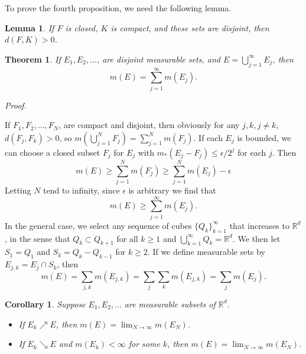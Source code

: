 \documentclass[
]{book}
\providecommand{\tightlist}{%
  \setlength{\itemsep}{0pt}\setlength{\parskip}{0pt}}
\newtheorem{theorem}{Theorem}[chapter]
\newtheorem{lemma}{Lemma}[chapter]
\newtheorem{corollary}{Corollary}[chapter]
\theoremstyle{definition}
\theoremstyle{definition}
\theoremstyle{definition}
\theoremstyle{definition}
\theoremstyle{remark}
\begin{document}
To prove the fourth proposition, we need the following lemma.

\begin{lemma}
If \(F\) is closed, \(K\) is compact, and these sets are disjoint, then \(d(F,K)>0\).
\end{lemma}

\begin{theorem}
If \(E_1,E_2,\dots\), are disjoint measurable sets, and \(E=\bigcup_{j=1}^{\infty}E_j\), then
\[
m(E)=\sum_{j=1}^{\infty}m(E_j).
\]
\end{theorem}

\emph{Proof.}

If \(F_1,F_2,\dots, F_N\), are compact and disjoint, then obviously for any \(j,k,j\ne k\), \(d(F_j,F_k)>0\), so \(m\left(\bigcup_{j=1}^NF_j\right)=\sum_{j=1}^Nm(F_j)\). If each \(E_j\) is bounded, we can choose a closed subset \(F_j\) for \(E_j\) with \(m_{\ast}(E_j-F_j)\leq \epsilon/2^j\) for each \(j\). Then
\[
  m(E) \geq \sum_{j=1}^Nm(F_j) \ge \sum_{j=1}^Nm(E_j)-\epsilon
\]
Letting \(N\) tend to infinity, since \(\epsilon\) is arbitrary we find that
\[
  m(E)\ge\sum_{j=1}^{\infty}m(E_j).
\]
In the general case, we select any sequence of cubes \(\{Q_k\}_{k=1}^{\infty}\) that increases to \(\mathbb{R}^d\), in the sense that \(Q_k\subset Q_{k+1}\) for all \(k\ge 1\) and \(\bigcup_{k=1}^{\infty}Q_k=\mathbb{R}^d\). We then let \(S_1=Q_1\) and \(S_k=Q_k-Q_{k-1}\) for \(k\ge 2\). If we define measurable sets by \(E_{j,k}=E_j\cap S_k\), then
\[
  m(E) =\sum_{j,k}m(E_{j,k})=\sum_j\sum_km(E_{j,k})=\sum_jm(E_j).
\]

\begin{corollary}

Suppose \(E_1,E_2,...\) are measurable subsets of \(\mathbb{R}^d\).

\begin{itemize}
\tightlist
\item
  If \(E_k \nearrow E\), then \(m(E) =\lim_{N\to \infty}m(E_N)\).
\item
  If \(E_k \searrow E\) and \(m(E_k)<\infty\) for some \(k\), then \(m(E) =\lim_{N\to \infty}m(E_N)\).
\end{itemize}

\end{corollary}
\end{document}

